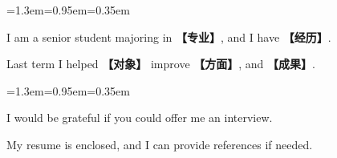 \documentclass[10pt,a4paper]{ctexart}
\begin{document}
\par\vspace{1pt}
\begin{list}{}{\leftmargin=1.3em=0.95em=0.35em\itemindent=0pt\topsep=0pt\partopsep=0pt\parsep=1.5pt\itemsep=0pt}
\item[{\color{accent}\scriptsize$\blacktriangleright$}]{\footnotesize I am a senior student majoring in {\color{accent}\bfseries 【专业】}, and I have {\color{accent}\bfseries 【经历】}.}\par{}
\item[{\color{accent}\scriptsize$\blacktriangleright$}]{\footnotesize Last term I helped {\color{accent}\bfseries 【对象】} improve {\color{accent}\bfseries 【方面】}, and {\color{accent}\bfseries 【成果】}.}\par{}
\end{list}
\par\vspace{1pt}
\begin{list}{}{\leftmargin=1.3em=0.95em=0.35em\itemindent=0pt\topsep=0pt\partopsep=0pt\parsep=1.5pt\itemsep=0pt}
\item[{\color{accent}\scriptsize$\blacktriangleright$}]{\footnotesize I would be grateful if you could offer me an interview.}\par{}
\item[{\color{accent}\scriptsize$\blacktriangleright$}]{\footnotesize My resume is enclosed, and I can provide references if needed.}\par{}
\end{list}
\par
\endgroup
\vspace{4pt}\par\nopagebreak
\end{document}
